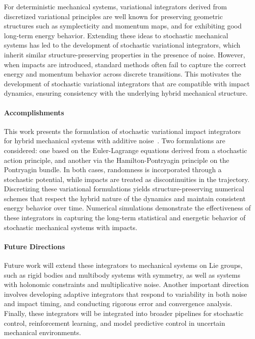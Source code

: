 \documentclass[letterpaper,11pt]{article}
\begin{document}
For deterministic mechanical systems, variational integrators derived from discretized variational principles are well known for preserving geometric structures such as symplecticity and momentum maps, and for exhibiting good long-term energy behavior. 
Extending these ideas to stochastic mechanical systems has led to the development of stochastic variational integrators, which inherit similar structure-preserving properties in the presence of noise. 
However, when impacts are introduced, standard methods often fail to capture the correct energy and momentum behavior across discrete transitions. 
This motivates the development of stochastic variational integrators that are compatible with impact dynamics, ensuring consistency with the underlying hybrid mechanical structure.

\paragraph{Accomplishments}

This work presents the formulation of stochastic variational impact integrators for hybrid mechanical systems with additive noise~\cite{CLeePIWLHMNC24}. 
Two formulations are considered: one based on the Euler-Lagrange equations derived from a stochastic action principle, and another via the Hamilton-Pontryagin principle on the Pontryagin bundle. 
In both cases, randomness is incorporated through a stochastic potential, while impacts are treated as discontinuities in the trajectory. 
Discretizing these variational formulations yields structure-preserving numerical schemes that respect the hybrid nature of the dynamics and maintain consistent energy behavior over time. 
Numerical simulations demonstrate the effectiveness of these integrators in capturing the long-term statistical and energetic behavior of stochastic mechanical systems with impacts.

\paragraph{Future Directions}

Future work will extend these integrators to mechanical systems on Lie groups, such as rigid bodies and multibody systems with symmetry, as well as systems with holonomic constraints and multiplicative noise. 
Another important direction involves developing adaptive integrators that respond to variability in both noise and impact timing, and conducting rigorous error and convergence analysis. 
Finally, these integrators will be integrated into broader pipelines for stochastic control, reinforcement learning, and model predictive control in uncertain mechanical environments.
\end{document}
